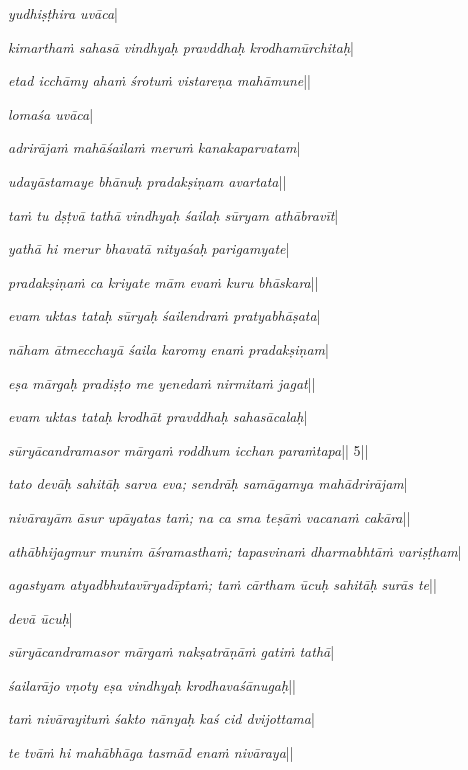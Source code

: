 {{ 
  \textit{yudhiṣṭhira uvāca}\thinspace |
 
  \textit{kimartha\.m sahasā vindhyaḥ pravddhaḥ krodhamūrchitaḥ}\thinspace |
 
  \textit{etad icchāmy aha\.m śrotu\.m vistareṇa mahāmune}\thinspace ||
 
  \textit{lomaśa uvāca}\thinspace |
 
  \textit{adrirāja\.m mahāśaila\.m meru\.m kanakaparvatam}\thinspace |
 
  \textit{udayāstamaye bhānuḥ pradakṣiṇam avartata}\thinspace ||
 
  \textit{ta\.m tu dṣṭvā tathā vindhyaḥ śailaḥ sūryam athābravīt}\thinspace |
 
  \textit{yathā hi merur bhavatā nityaśaḥ parigamyate}\thinspace |
 
  \textit{pradakṣiṇa\.m ca kriyate mām eva\.m kuru bhāskara}\thinspace ||
 
  \textit{evam uktas tataḥ sūryaḥ śailendra\.m pratyabhāṣata}\thinspace |
 
  \textit{nāham ātmecchayā śaila karomy ena\.m pradakṣiṇam}\thinspace |
 
  \textit{eṣa mārgaḥ pradiṣṭo me yeneda\.m nirmita\.m jagat}\thinspace ||
 
  \textit{evam uktas tataḥ krodhāt pravddhaḥ sahasācalaḥ}\thinspace |
 
  \textit{sūryācandramasor mārga\.m roddhum icchan para\.mtapa}\thinspace || 5\thinspace ||
 
  \textit{tato devāḥ sahitāḥ sarva eva; sendrāḥ samāgamya mahādrirājam}\thinspace |
 
  \textit{nivārayām āsur upāyatas ta\.m; na ca sma teṣā\.m vacana\.m cakāra}\thinspace ||
 
  \textit{athābhijagmur munim āśramastha\.m; tapasvina\.m dharmabhtā\.m variṣṭham}\thinspace |
 
  \textit{agastyam atyadbhutavīryadīpta\.m; ta\.m cārtham ūcuḥ sahitāḥ surās te}\thinspace ||
 
  \textit{devā ūcuḥ}\thinspace |
 
  \textit{sūryācandramasor mārga\.m nakṣatrāṇā\.m gati\.m tathā}\thinspace |
 
  \textit{śailarājo vṇoty eṣa vindhyaḥ krodhavaśānugaḥ}\thinspace ||
 
  \textit{ta\.m nivārayitu\.m śakto nānyaḥ kaś cid dvijottama}\thinspace |
 
  \textit{te tvā\.m hi mahābhāga tasmād ena\.m nivāraya}\thinspace ||
 
}}
